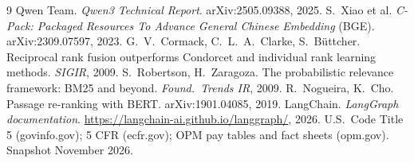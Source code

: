 \begin{thebibliography}{9}\setlength{\itemsep}{0pt}
 Qwen Team. \emph{Qwen3 Technical Report}. arXiv:2505.09388, 2025.
 S.~Xiao et al. \emph{C-Pack: Packaged Resources To Advance General Chinese Embedding} (BGE). arXiv:2309.07597, 2023.
 G.~V.~Cormack, C.~L.~A.~Clarke, S.~B\"uttcher. Reciprocal rank fusion outperforms Condorcet and individual rank learning methods. \emph{SIGIR}, 2009.
 S.~Robertson, H.~Zaragoza. The probabilistic relevance framework: BM25 and beyond. \emph{Found.\ Trends IR}, 2009.
 R.~Nogueira, K.~Cho. Passage re-ranking with BERT. arXiv:1901.04085, 2019.
 LangChain. \emph{LangGraph documentation}. \url{https://langchain-ai.github.io/langgraph/}, 2026.
 U.S.\ Code Title 5 (govinfo.gov); 5 CFR (ecfr.gov); OPM pay tables and fact sheets (opm.gov). Snapshot November 2026.
\end{thebibliography}
